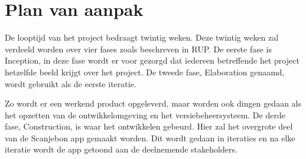 \documentclass[a4paper,11pt,oneside]{report}
\begin{document}
\chapter{Plan van aanpak}
De looptijd van het project bedraagt twintig weken. Deze twintig weken zal verdeeld worden over vier fases zoals beschreven in RUP. De eerste fase is Inception, in deze fase wordt er voor gezorgd dat iedereen betreffende het project hetzelfde beeld krijgt over het project. De tweede fase, Elaboration genaamd, wordt gebruikt als de eerste iteratie.

Zo wordt er een werkend product opgeleverd, maar worden ook dingen gedaan als het opzetten van de ontwikkelomgeving en het versiebeheersysteem. De derde fase, Construction, is waar het ontwikkelen gebeurd. Hier zal het overgrote deel van de Scanjebon app gemaakt worden. Dit wordt gedaan in iteraties en na elke iteratie wordt de app getoond aan de deelnemende stakeholders. 
\end{document}
